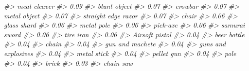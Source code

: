\documentclass[
]{krantz}
\makeatletter
\newenvironment{Shaded}{\begin{snugshade}}{\end{snugshade}}
\newcommand{\CommentTok}[1]{\textcolor[rgb]{0.37,0.37,0.37}{\textit{#1}}}
\newenvironment{kframe}{%
\medskip{}
\setlength{\fboxsep}{.8em}
 \def\at@end@of@kframe{}%
 \ifinner\ifhmode%
  \def\at@end@of@kframe{\end{minipage}}%
  \begin{minipage}{\columnwidth}%
 \fi\fi%
 \def\FrameCommand##1{\hskip\@totalleftmargin \hskip-\fboxsep
 \colorbox{shadecolor}{##1}\hskip-\fboxsep
     \hskip-\linewidth \hskip-\@totalleftmargin \hskip\columnwidth}%
 \MakeFramed {\advance\hsize-\width
   \@totalleftmargin\z@ \linewidth\hsize
   \@setminipage}}%
 {\par\unskip\endMakeFramed%
 \at@end@of@kframe}
\renewenvironment{Shaded}{\begin{kframe}}{\end{kframe}}
\makeatother
\begin{document}
\begin{Shaded}
\begin{Highlighting}[]
\CommentTok{\#\textgreater{}                     meat cleaver }
\CommentTok{\#\textgreater{}                             0.09 }
\CommentTok{\#\textgreater{}                     blunt object }
\CommentTok{\#\textgreater{}                             0.07 }
\CommentTok{\#\textgreater{}                          crowbar }
\CommentTok{\#\textgreater{}                             0.07 }
\CommentTok{\#\textgreater{}                     metal object }
\CommentTok{\#\textgreater{}                             0.07 }
\CommentTok{\#\textgreater{}              straight edge razor }
\CommentTok{\#\textgreater{}                             0.07 }
\CommentTok{\#\textgreater{}                            chair }
\CommentTok{\#\textgreater{}                             0.06 }
\CommentTok{\#\textgreater{}                      glass shard }
\CommentTok{\#\textgreater{}                             0.06 }
\CommentTok{\#\textgreater{}                       metal pole }
\CommentTok{\#\textgreater{}                             0.06 }
\CommentTok{\#\textgreater{}                         pick{-}axe }
\CommentTok{\#\textgreater{}                             0.06 }
\CommentTok{\#\textgreater{}                    samurai sword }
\CommentTok{\#\textgreater{}                             0.06 }
\CommentTok{\#\textgreater{}                        tire iron }
\CommentTok{\#\textgreater{}                             0.06 }
\CommentTok{\#\textgreater{}                   Airsoft pistol }
\CommentTok{\#\textgreater{}                             0.04 }
\CommentTok{\#\textgreater{}                      beer bottle }
\CommentTok{\#\textgreater{}                             0.04 }
\CommentTok{\#\textgreater{}                            chain }
\CommentTok{\#\textgreater{}                             0.04 }
\CommentTok{\#\textgreater{}                  gun and machete }
\CommentTok{\#\textgreater{}                             0.04 }
\CommentTok{\#\textgreater{}              guns and explosives }
\CommentTok{\#\textgreater{}                             0.04 }
\CommentTok{\#\textgreater{}                      metal stick }
\CommentTok{\#\textgreater{}                             0.04 }
\CommentTok{\#\textgreater{}                       pellet gun }
\CommentTok{\#\textgreater{}                             0.04 }
\CommentTok{\#\textgreater{}                             pole }
\CommentTok{\#\textgreater{}                             0.04 }
\CommentTok{\#\textgreater{}                            brick }
\CommentTok{\#\textgreater{}                             0.03 }
\CommentTok{\#\textgreater{}                        chain saw }

\end{Highlighting}
\end{Shaded}
\end{document}
